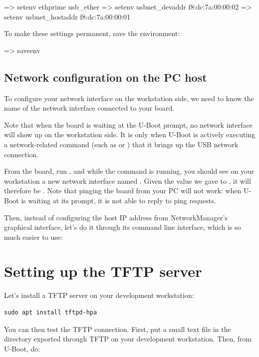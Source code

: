 \begin{ubootinput}
=> setenv ethprime usb_ether
=> setenv usbnet_devaddr f8:dc:7a:00:00:02
=> setenv usbnet_hostaddr f8:dc:7a:00:00:01
\end{ubootinput}

To make these settings permanent, save the environment:

\begin{ubootinput}
=> saveenv
\end{ubootinput}

\subsection{Network configuration on the PC host}

To configure your network interface on the workstation side, we need
to know the name of the network interface connected to your board.

Note that when the board is waiting at the U-Boot prompt, no network
interface will show up on the workstation side. It is only when U-Boot
is actively executing a network-related command (such as 
or ) that it brings up the USB network connection.

From the board, run , and while the 
command is running, you should see on your workstation a new network
interface named . Given the value we gave to
, it will therefore be
. Note that pinging the board from your PC will
not work: when U-Boot is waiting at its prompt, it is not able to
reply to ping requests.

Then, instead of configuring the host IP address from NetworkManager's
graphical interface, let's do it through its command line interface,
which is so much easier to use:


\section{Setting up the TFTP server}

Let's install a TFTP server on your development workstation:

\begin{verbatim}
sudo apt install tftpd-hpa
\end{verbatim}

You can then test the TFTP connection. First, put a small text file in
the directory exported through TFTP on your development
workstation. Then, from U-Boot, do:

